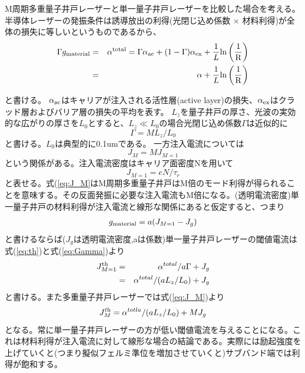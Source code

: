 M周期多重量子井戸レーザーと単一量子井戸レーザーを比較した場合を考える。
半導体レーザーの発振条件は誘導放出の利得(光閉じ込め係数 × 材料利得)が全体の損失に等しいというものであるから、
\begin{eqnarray}
\label{eq:th}
\Gamma g_{\rm{material}}&=&\alpha^{\rm{total}}= \Gamma \alpha_{\rm{ac}} +(1-\Gamma)\alpha_{\rm{ex}}+\dfrac{1}{L}\rm{ln}\left( \dfrac{1}{R} \right )\\
&=& \alpha + \dfrac{1}{L}\rm{ln}\left( \dfrac{1}{R} \right )
\end{eqnarray}

と書ける。
$\alpha_{\rm{ac}}$はキャリアが注入される活性層(active layer)の損失、$\alpha_{\rm{ex}}$はクラッド層およびバリア層の損失の平均を表す。
$L_{z}$を量子井戸の厚さ、光波の実効的な広がりの厚さを$L_{0}$とすると、$L_{z}\ll L_{0}$の場合光閉じ込め係数$\Gamma$は近似的に
\begin{equation}
\Gamma = ML_{z}/L_{0}
\label{eq:Gamma}
\end{equation}
と書ける。$L_{0}$は典型的に0.1umである。
一方注入電流については
\begin{equation}
J_{M}=MJ_{M=1}
\label{eq:J_M}
\end{equation}
という関係がある。注入電流密度はキャリア面密度Nを用いて
\begin{equation}
J_{M=1}=eN/\tau_{r}
\end{equation}
と表せる。式(\ref{eq:J_M}はM周期多重量子井戸はM倍のモード利得が得られることを意味する。その反面発振に必要な注入電流もM倍になる。(透明電流密度)単一量子井戸の材料利得が注入電流と線形な関係にあると仮定すると、つまり
\begin{eqnarray}
g_{\rm{material}}=a(J_{M=1}-J_{g})
\end{eqnarray}
と書けるならば($J_{g}$は透明電流密度,aは係数)単一量子井戸レーザーの閾値電流は式(\ref{eq:th})と式(\ref{eq:Gamma})より
\begin{eqnarray}
J^{\rm{th}}_{M=1}&=&\alpha^{total}/ a\Gamma + J_{g}\nonumber\\
&=&\alpha^{total}/(aL_{z}/L_{0})+J_{g} 
\end{eqnarray}
と書ける。また多重量子井戸レーザーでは式(\ref{eq:J_M})より
\begin{equation}
J_{M}^{t\rm{h}}=\alpha^{totla}/(aL_{z}/L_{0}) + MJ_{g}
\end{equation}
となる。常に単一量子井戸レーザーの方が低い閾値電流を与えることになる。これは材料利得が注入電流に対して線形な場合の結論である。実際には励起強度を上げていくと(つまり擬似フェルミ準位を増加させていくと)サブバンド端では利得が飽和する。



